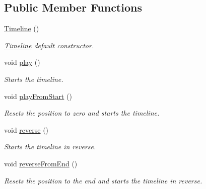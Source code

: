 \subsection*{Public Member Functions}
\begin{DoxyCompactItemize}
\item 
\mbox{\hyperlink{class_arcana_1_1_timeline_a4a9b19ce9b7480a6816c0476b7fa2330}{Timeline}} ()
\begin{DoxyCompactList}\small\item\em \mbox{\hyperlink{class_arcana_1_1_timeline}{Timeline}} default constructor. \end{DoxyCompactList}\item 
\mbox{\label{class_arcana_1_1_timeline_a21dd0ab8ed0aac6c25c4fe604c4a31a5}} 
void \mbox{\hyperlink{class_arcana_1_1_timeline_a21dd0ab8ed0aac6c25c4fe604c4a31a5}{play}} ()
\begin{DoxyCompactList}\small\item\em Starts the timeline. \end{DoxyCompactList}\item 
\mbox{\label{class_arcana_1_1_timeline_ad0286df5c28fa561e8222bdc29e9e61b}} 
void \mbox{\hyperlink{class_arcana_1_1_timeline_ad0286df5c28fa561e8222bdc29e9e61b}{play\+From\+Start}} ()
\begin{DoxyCompactList}\small\item\em Resets the position to zero and starts the timeline. \end{DoxyCompactList}\item 
\mbox{\label{class_arcana_1_1_timeline_a3271fcaccf36add4e09dfa1342749c4d}} 
void \mbox{\hyperlink{class_arcana_1_1_timeline_a3271fcaccf36add4e09dfa1342749c4d}{reverse}} ()
\begin{DoxyCompactList}\small\item\em Starts the timeline in reverse. \end{DoxyCompactList}\item 
\mbox{\label{class_arcana_1_1_timeline_aabdf70e515e2708e1749beb5dece6190}} 
void \mbox{\hyperlink{class_arcana_1_1_timeline_aabdf70e515e2708e1749beb5dece6190}{reverse\+From\+End}} ()
\begin{DoxyCompactList}\small\item\em Resets the position to the end and starts the timeline in reverse. \end{DoxyCompactList}\item 

\end{DoxyCompactItemize}

